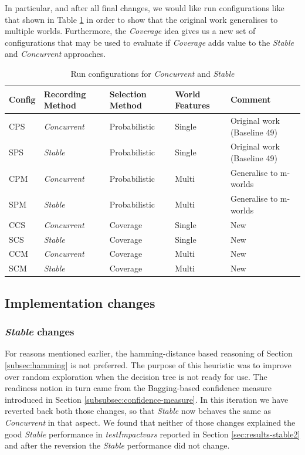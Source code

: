\documentclass[a4paper]{article}
\newcommand{\cc}{\emph{Concurrent}\xspace}
\newcommand{\st}{\emph{Stable}\xspace}
\newcommand{\cov}{\emph{Coverage}\xspace}
\newcommand{\tiv}{\emph{testImpactvars}\xspace}
\newcommand{\dt}{{decision tree}\xspace}
\begin{document}
In particular, and after all final changes, we would like run configurations like that shown in Table \ref{tab:final-config} in order to show that the original work generalises to multiple worlds. Furthermore, the \cov idea gives us a new set of configurations that may be used to evaluate if \cov adds value to the \st and \cc approaches.

\begin{table}[!htb]
\centering
  \begin{tabular}{ p{} p{} p{} p{} p{} }
    \hline \hline
    Config & Recording Method & Selection Method & World Features & Comment\\ \hline
    CPS & \cc & Probabilistic & Single & Original work (Baseline 49)\\ \hline
    SPS & \st & Probabilistic & Single &  Original work (Baseline 49)\\ \hline
    CPM & \cc & Probabilistic & Multi & Generalise to m-worlds\\ \hline
    SPM & \st & Probabilistic & Multi & Generalise to m-worlds\\ \hline
    CCS & \cc & Coverage & Single & New\\ \hline
    SCS & \st & Coverage & Single & New\\ \hline
    CCM & \cc & Coverage & Multi & New\\ \hline
    SCM & \st & Coverage & Multi & New\\ \hline
  \end{tabular}
  \caption{Run configurations for \cc and \st}
  \label{tab:final-config}
\end{table}

\subsection{Implementation changes}

\subsubsection{\st changes}

For reasons mentioned earlier, the hamming-distance based reasoning of Section \ref{subsec:hamming} is not preferred. The purpose of this heuristic was to improve over random exploration when the \dt is not ready for use. The readiness notion in turn came from the Bagging-based confidence measure introduced in Section \ref{subsubsec:confidence-measure}. In this iteration we have reverted back both those changes, so that \st now behaves the same as \cc in that aspect. We found that neither of those changes explained the good \st performance in \tiv reported in Section \ref{sec:results-stable2} and after the reversion the \st performance did not change.
\end{document}
